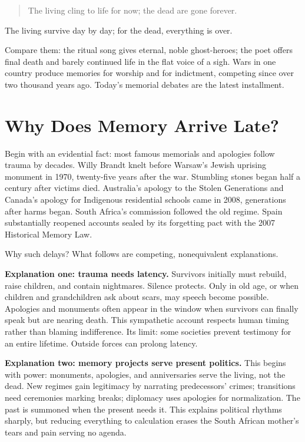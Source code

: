 \begin{quote}
The living cling to life for now; the dead are gone forever.
\end{quote}
The living survive day by day; for the dead, everything is over.

Compare them: the ritual song gives eternal, noble ghost-heroes; the poet offers final death and barely continued life in the flat voice of a sigh. Wars in one country produce memories for worship and for indictment, competing since over two thousand years ago. Today's memorial debates are the latest installment.

\section{Why Does Memory Arrive Late?}
Begin with an evidential fact: most famous memorials and apologies follow trauma by decades. Willy Brandt knelt before Warsaw's Jewish uprising monument in 1970, twenty-five years after the war. Stumbling stones began half a century after victims died. Australia's apology to the Stolen Generations and Canada's apology for Indigenous residential schools came in 2008, generations after harms began. South Africa's commission followed the old regime. Spain substantially reopened accounts sealed by its forgetting pact with the 2007 Historical Memory Law.

Why such delays? What follows are competing, nonequivalent explanations.

\textbf{Explanation one: trauma needs latency.} Survivors initially must rebuild, raise children, and contain nightmares. Silence protects. Only in old age, or when children and grandchildren ask about scars, may speech become possible. Apologies and monuments often appear in the window when survivors can finally speak but are nearing death. This sympathetic account respects human timing rather than blaming indifference. Its limit: some societies prevent testimony for an entire lifetime. Outside forces can prolong latency.

\textbf{Explanation two: memory projects serve present politics.} This begins with power: monuments, apologies, and anniversaries serve the living, not the dead. New regimes gain legitimacy by narrating predecessors' crimes; transitions need ceremonies marking breaks; diplomacy uses apologies for normalization. The past is summoned when the present needs it. This explains political rhythms sharply, but reducing everything to calculation erases the South African mother's tears and pain serving no agenda.

